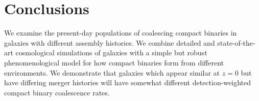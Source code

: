 \documentclass[nofootinbib,twocolumn,prd]{emulateapj}
\newcommand\editremark[1]{{\color{red}#1}}
\newcommand\jillianremark[1]{{\color{blue}#1}}
\begin{document}






\section{Conclusions}
\label{sec:conclude}

We examine the present-day populations of coalescing compact binaries in galaxies with different assembly histories.  We
combine  detailed and state-of-the-art cosmological simulations of galaxies with a simple but robust phenomenological
model for how compact binaries form from different environments.   
 We demonstrate that
galaxies which appear similar at $z = 0$ but have differing merger histories will have somewhat different
detection-weighted compact binary
coalescence rates.   
\end{document}
